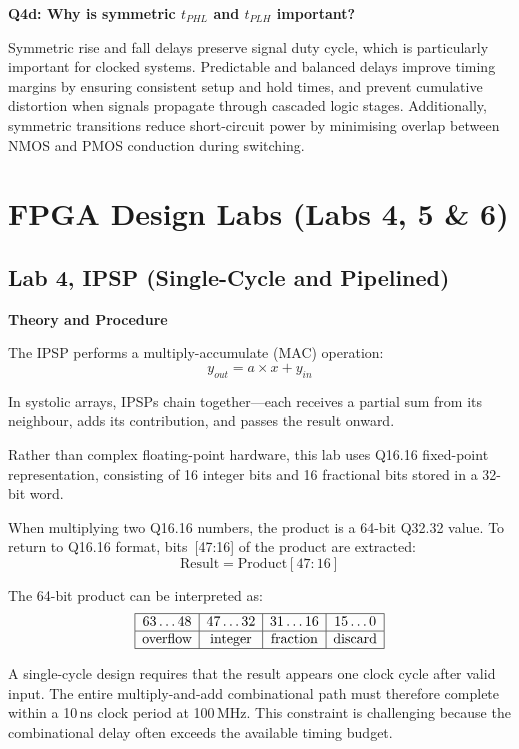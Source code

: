 \documentclass[a4paper,12pt]{article}
\begin{document}
\textbf{Q4d: Why is symmetric $t_{PHL}$ and $t_{PLH}$ important?}

Symmetric rise and fall delays preserve signal duty cycle, which is particularly important for clocked systems. Predictable and balanced delays improve timing margins by ensuring consistent setup and hold times, and prevent cumulative distortion when signals propagate through cascaded logic stages. Additionally, symmetric transitions reduce short-circuit power by minimising overlap between NMOS and PMOS conduction during switching.

\section{FPGA Design Labs \- (Labs 4, 5 \& 6)}

\subsection{Lab 4, IPSP (Single-Cycle and Pipelined)}

\textbf{Theory and Procedure}

The IPSP performs a multiply-accumulate (MAC) operation:
\begin{equation}
y_{out} = a \times x + y_{in}
\end{equation}

In systolic arrays, IPSPs chain together—each receives a partial sum from its neighbour, adds its contribution, and passes the result onward.

Rather than complex floating-point hardware, this lab uses Q16.16 fixed-point representation, consisting of 16 integer bits and 16 fractional bits stored in a 32-bit word.

When multiplying two Q16.16 numbers, the product is a 64-bit Q32.32 value. To return to Q16.16 format, bits~[47:16] of the product are extracted:
\begin{equation}
\text{Result} = \text{Product}[47:16]
\end{equation}

The 64-bit product can be interpreted as:
\[
\begin{array}{|c|c|c|c|}
\hline
63\ldots48 & 47\ldots32 & 31\ldots16 & 15\ldots0 \\
\hline
\text{overflow} & \text{integer} & \text{fraction} & \text{discard} \\
\hline
\end{array}
\]

A single-cycle design requires that the result appears one clock cycle after valid input. The entire multiply-and-add combinational path must therefore complete within a 10\,ns clock period at 100\,MHz. This constraint is challenging because the combinational delay often exceeds the available timing budget.
\end{document}
